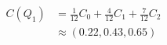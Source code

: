 \documentclass[border=6pt]{standalone}
\begin{document}
\color{white}
\(\displaystyle
\begin{aligned}
C(Q_1) &= \frac{1}{12} C_0 + \frac{4}{12} C_1 + \frac{7}{12} C_2 \\
       &\approx (0.22,0.43,0.65)
\end{aligned}
\)
\end{document}
